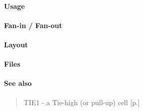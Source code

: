 \paragraph{Usage}

\paragraph{Fan-in / Fan-out}

\paragraph{Layout}

\paragraph{Files}

\paragraph{See also}
\begin{quote}
    TIE1 - a Tie-high (or pull-up) cell [p.\pageref{TIE1}]
\end{quote}
